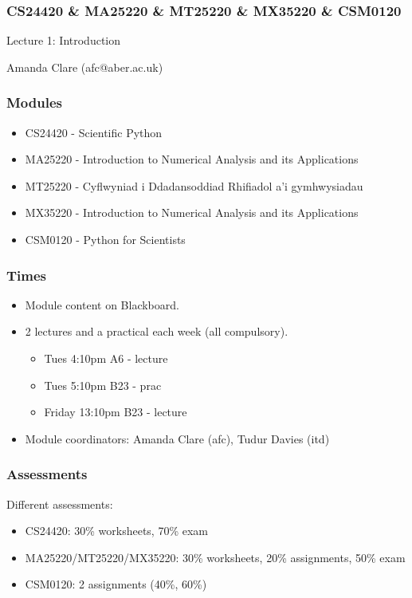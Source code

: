 \documentclass{beamer}
\begin{document}
\begin{frame}
\frametitle{CS24420 \& MA25220 \& MT25220 \& MX35220 \& CSM0120}

\begin{center}
\begin{huge}
Lecture 1: Introduction 
\end{huge}
\bigskip

Amanda Clare (afc@aber.ac.uk)

\end{center}
\end{frame}

\begin{frame}
\frametitle{Modules}
\begin{itemize}
\item CS24420 - Scientific Python
\item MA25220 - Introduction to Numerical Analysis and its
  Applications
\item MT25220 - Cyflwyniad i Ddadansoddiad Rhifiadol a'i gymhwysiadau
\item MX35220 - Introduction to Numerical Analysis and its Applications
\item CSM0120 - Python for Scientists
\end{itemize}
\end{frame}

\begin{frame}
\frametitle{Times}
\begin{itemize}
\item Module content on Blackboard.
\item 2 lectures and a practical each week (all compulsory).
\begin{itemize}
\item Tues 4:10pm A6 - lecture
\item Tues 5:10pm B23 - prac
\item Friday 13:10pm B23 - lecture 
\end{itemize}
\item Module coordinators: Amanda Clare (afc), Tudur Davies (itd)
\end{itemize}
\end{frame}

\begin{frame}
\frametitle{Assessments}
Different assessments:
\begin{itemize}
\item CS24420: 30\% worksheets, 70\% exam
\item MA25220/MT25220/MX35220: 30\% worksheets, 20\% assignments, 50\% exam
\item CSM0120: 2 assignments (40\%, 60\%) 
\end{itemize}
\end{frame}
\end{document}
